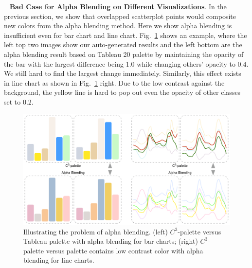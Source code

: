 \documentclass[review,onecolumn]{vgtc}                %
\newcommand{\myparagraph}[1]{\mbox{\ } \newline \noindent \textbf{#1}}
\renewcommand{\paragraph}[1]{\myparagraph{#1}}
\begin{document}
\paragraph{Bad Case for Alpha Blending on Different Visualizations}.
In the previous section, we show that overlapped scatterplot points would composite new colors from the alpha blending method. Here we show alpha blending is insufficient even for bar chart and line chart. Fig.~\ref{fig:badcaseAB} shows an example, where the left top two images show our auto-generated results and the left bottom are the alpha blending result based on Tableau 20 palette by maintaining the opacity of the bar with the largest difference being 1.0 while changing others' opacity to 0.4. We still hard to find the largest change immediately. Similarly, this effect exists in line chart as shown in Fig.~\ref{fig:badcaseAB} right. Due to the low contrast against the background, the yellow line is hard to pop out even the opacity of other classes set to 0.2.

\begin{figure}[ht]
\centering
\includegraphics[width=0.96\linewidth]{badcaseAB.pdf}
\caption{Illustrating the problem of alpha blending. (left) $C^3$-palette versus Tableau palette with alpha blending for bar charts; (right) $C^3$-palette versus palette contains low contrast color with alpha blending for line charts.}
\vspace*{-5mm}
\label{fig:badcaseAB}
\end{figure}


\end{document}
